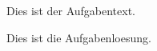 \documentclass{atistandalonetask}
\begin{document}
  \begin{atiTask}[
    title = Aufgabentitle
  ]
    Dies ist der Aufgabentext.
  \end{atiTask}
  \begin{atiSolution}
    Dies ist die Aufgabenloesung.
  \end{atiSolution}
\end{document}
